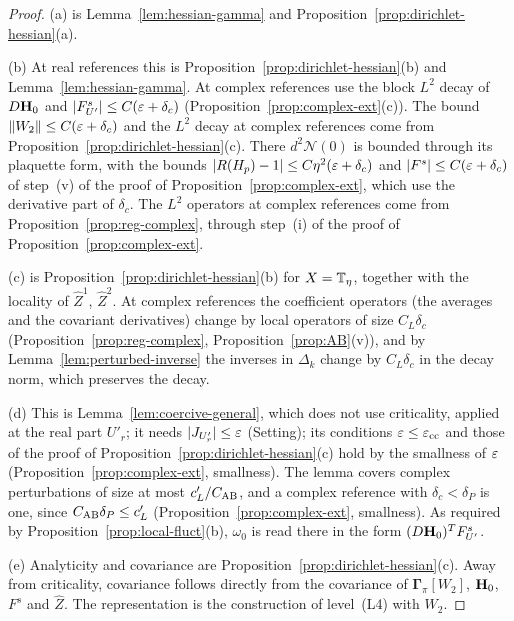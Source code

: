 \begin{proof}
(a) is Lemma~\ref{lem:hessian-gamma} and Proposition~\ref{prop:dirichlet-hessian}(a).

(b) At real references this is Proposition~\ref{prop:dirichlet-hessian}(b) and Lemma~\ref{lem:hessian-gamma}. At complex references use the block $L^2$ decay of $D\mathbf H_0$ and $|F^s_{U'}|\le C(\varepsilon+\delta_c)$ (Proposition~\ref{prop:complex-ext}(c)). The bound $\|W_2\|\le C(\varepsilon+\delta_c)$ and the $L^2$ decay at complex references come from Proposition~\ref{prop:dirichlet-hessian}(c). There $d^2\mathcal N(0)$ is bounded through its plaquette form, with the bounds $|R(H_p)-1|\le C\eta^2(\varepsilon+\delta_c)$ and $|F^s|\le C(\varepsilon+\delta_c)$ of step~(v) of the proof of Proposition~\ref{prop:complex-ext}, which use the derivative part of $\delta_c$. The $L^2$ operators at complex references come from Proposition~\ref{prop:reg-complex}, through step~(i) of the proof of Proposition~\ref{prop:complex-ext}.

(c) is Proposition~\ref{prop:dirichlet-hessian}(b) for $X=\mathbb T_\eta$, together with the locality of $\hat Z^1$, $\hat Z^2$. At complex references the coefficient operators (the averages and the covariant derivatives) change by local operators of size $C_L\delta_c$ (Proposition~\ref{prop:reg-complex}, Proposition~\ref{prop:AB}(v)), and by Lemma~\ref{lem:perturbed-inverse} the inverses in $\Delta_k$ change by $C_L\delta_c$ in the decay norm, which preserves the decay.

(d) This is Lemma~\ref{lem:coercive-general}, which does not use criticality, applied at the real part $U'_r$; it needs $|J_{U'_r}|\le\varepsilon$ (Setting); its conditions $\varepsilon\le\varepsilon_{\rm cc}$ and those of the proof of Proposition~\ref{prop:dirichlet-hessian}(c) hold by the smallness of $\varepsilon$ (Proposition~\ref{prop:complex-ext}, smallness). The lemma covers complex perturbations of size at most $c'_L/C_{\rm AB}$, and a complex reference with $\delta_c<\delta_P$ is one, since $C_{\rm AB}\delta_P\le c'_L$ (Proposition~\ref{prop:complex-ext}, smallness). As required by Proposition~\ref{prop:local-fluct}(b), $\omega_0$ is read there in the form $(D\mathbf H_0)^TF^s_{U'}$.

(e) Analyticity and covariance are Proposition~\ref{prop:dirichlet-hessian}(c). Away from criticality, covariance follows directly from the covariance of $\boldsymbol\Gamma_\pi[W_2]$, $\mathbf H_0$, $F^s$ and $\hat Z$. The representation is the construction of level~(L4) with $W_2$.
\end{proof}

